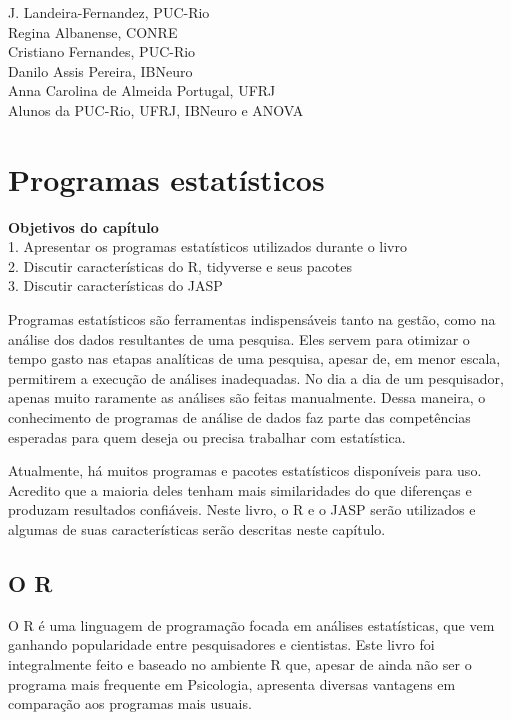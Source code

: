 \documentclass[
]{book}
\begin{document}
J. Landeira-Fernandez, PUC-Rio\\
Regina Albanense, CONRE\\
Cristiano Fernandes, PUC-Rio\\
Danilo Assis Pereira, IBNeuro\\
Anna Carolina de Almeida Portugal, UFRJ\\
Alunos da PUC-Rio, UFRJ, IBNeuro e ANOVA

\hypertarget{programas-estatuxedsticos}{%
\chapter{Programas estatísticos}\label{programas-estatuxedsticos}}

\begin{objectives}
\textbf{Objetivos do capítulo}\\
1. Apresentar os programas estatísticos utilizados durante o livro\\
2. Discutir características do R, tidyverse e seus pacotes\\
3. Discutir características do JASP
\end{objectives}

Programas estatísticos são ferramentas indispensáveis tanto na gestão, como na análise dos dados resultantes de uma pesquisa. Eles servem para otimizar o tempo gasto nas etapas analíticas de uma pesquisa, apesar de, em menor escala, permitirem a execução de análises inadequadas. No dia a dia de um pesquisador, apenas muito raramente as análises são feitas manualmente. Dessa maneira, o conhecimento de programas de análise de dados faz parte das competências esperadas para quem deseja ou precisa trabalhar com estatística.

Atualmente, há muitos programas e pacotes estatísticos disponíveis para uso. Acredito que a maioria deles tenham mais similaridades do que diferenças e produzam resultados confiáveis. Neste livro, o R e o JASP serão utilizados e algumas de suas características serão descritas neste capítulo.

\hypertarget{o-r}{%
\section{O R}\label{o-r}}

O R é uma linguagem de programação focada em análises estatísticas, que vem ganhando popularidade entre pesquisadores e cientistas. Este livro foi integralmente feito e baseado no ambiente R que, apesar de ainda não ser o programa mais frequente em Psicologia, apresenta diversas vantagens em comparação aos programas mais usuais.
\end{document}
